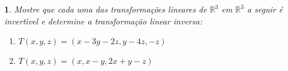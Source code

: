 \documentclass[12pt]{exam}
\newtheorem{exercicio}{}
\newcommand{\real}{\mathbb{R}}
\newcommand{\cp}[1]{\mathbb{#1}}
\begin{document}


\begin{exercicio}
  Mostre que cada uma das transforma\c{c}\~oes lineares de $\real^3$ em $\real^3$ a seguir \'e invert{\'\i}vel e determine a transforma\c{c}\~ao linear inversa:
  \begin{enumerate}[label=({\alph*})]
    \item $T(x,y,z) = (x - 3y - 2z, y - 4z, -z)$
    \item $T(x,y,z) = (x, x - y, 2x + y -z)$
  \end{enumerate}
\end{exercicio}
\end{document}
